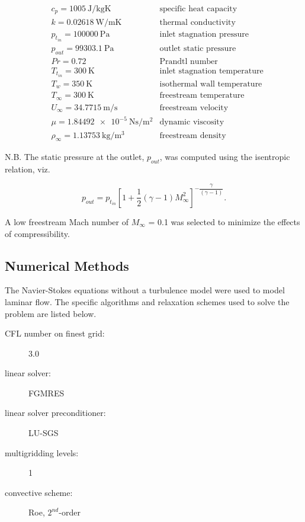 \documentclass[12pt,letterpaper]{article}
\begin{document}
\begin{align*}
&c_p = \SI{1005}{\joule\per\kilogram\kelvin} & \text{specific heat capacity} \\
&k = \SI{0.02618}{\watt\per\meter\kelvin} & \text{thermal conductivity} \\
&p_{t_{in}} = \SI{100000}{\pascal} & \text{inlet stagnation pressure} \\
&p_{out} = \SI{99303.1}{\pascal} & \text{outlet static pressure} \\
&Pr = 0.72 &\text{Prandtl number} \\
&T_{t_{in}} = \SI{300}{\kelvin} & \text{inlet stagnation temperature} \\
&T_w = \SI{350}{\kelvin} & \text{isothermal wall temperature} \\
&T_\infty = \SI{300}{\kelvin} & \text{freestream temperature} \\
&U_\infty = \SI{34.7715}{\meter\per\second} & \text{freestream velocity}\\
&\mu = \SI{1.84492e-5}{\newton\second\per\meter\squared} & \text{dynamic viscosity} \\
&\rho_\infty = \SI{1.13753}{\kilogram\per\meter\cubed} & \text{freestream density}
\end{align*}

N.B. The static pressure at the outlet, $p_{out}$, was computed using the isentropic relation, viz.

\begin{equation*}
p_{out} = p_{t_{in}}\left[ 1+\dfrac{1}{2}\left( \gamma-1\right) M_\infty^2 \right] ^{-\dfrac{\gamma}{\left( \gamma-1\right) }}.
\end{equation*}

A low freestream Mach number of $M_\infty$ = 0.1 was selected to minimize the effects of compressibility.

\subsection*{Numerical Methods}
The Navier-Stokes equations without a turbulence model were used to model laminar flow. The specific algorithms and relaxation schemes used to solve the problem are listed below.

\begin{description}
\item[CFL number on finest grid:] 3.0
\item[linear solver:] FGMRES
\item[linear solver preconditioner:] LU-SGS
\item[multigridding levels:] 1
\item[convective scheme:] Roe, $2^{nd}$-order
\end{description}
\end{document}
